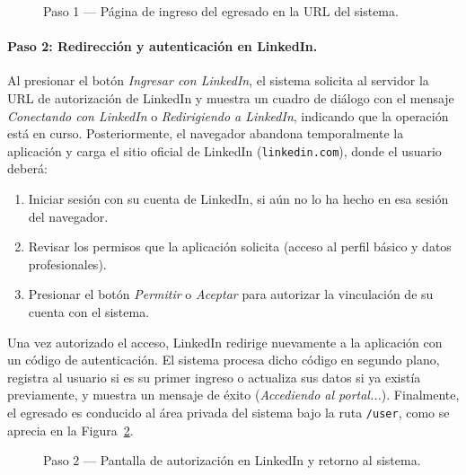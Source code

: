 \begin{figure}[H]
\centering
{}
\caption{Paso 1 --- Página de ingreso del egresado en la URL del sistema.}
\label{fig:login-egresado-paso1}
\end{figure}

\paragraph{Paso 2: Redirección y autenticación en LinkedIn.}

Al presionar el botón \emph{Ingresar con LinkedIn}, el sistema solicita al servidor la URL de autorización de LinkedIn y muestra un cuadro de diálogo con el mensaje \emph{Conectando con LinkedIn} o \emph{Redirigiendo a LinkedIn}, indicando que la operación está en curso. Posteriormente, el navegador abandona temporalmente la aplicación y carga el sitio oficial de LinkedIn (\texttt{linkedin.com}), donde el usuario deberá:

\begin{enumerate}
\item Iniciar sesión con su cuenta de LinkedIn, si aún no lo ha hecho en esa sesión del navegador.
\item Revisar los permisos que la aplicación solicita (acceso al perfil básico y datos profesionales).
\item Presionar el botón \emph{Permitir} o \emph{Aceptar} para autorizar la vinculación de su cuenta con el sistema.
\end{enumerate}

Una vez autorizado el acceso, LinkedIn redirige nuevamente a la aplicación con un código de autenticación. El sistema procesa dicho código en segundo plano, registra al usuario si es su primer ingreso o actualiza sus datos si ya existía previamente, y muestra un mensaje de éxito (\emph{Accediendo al portal...}). Finalmente, el egresado es conducido al área privada del sistema bajo la ruta \texttt{/user}, como se aprecia en la Figura~\ref{fig:login-egresado-paso2}.

\begin{figure}[H]
\centering
{}
\caption{Paso 2 --- Pantalla de autorización en LinkedIn y retorno al sistema.}
\label{fig:login-egresado-paso2}
\end{figure}

